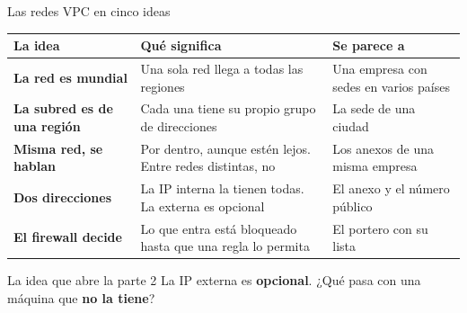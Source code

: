 \documentclass[aspectratio=169,10pt,c]{beamer}
\begin{document}
\begin{frame}{Las redes VPC en cinco ideas}
\renewcommand{\arraystretch}{1.4}
\centering\small
\begin{tabular}{@{}>{\raggedright\arraybackslash}p{3.7cm}>{\raggedright\arraybackslash}p{5.3cm}>{\raggedright\arraybackslash}p{3.9cm}@{}}
\toprule
\textbf{La idea} & \textbf{Qué significa} & \textbf{Se parece a}\\
\midrule
\textbf{La red es mundial} & Una sola red llega a todas las regiones & Una empresa con sedes en varios países\\
\textbf{La subred es de una región} & Cada una tiene su propio grupo de direcciones & La sede de una ciudad\\
\textbf{Misma red, se hablan} & Por dentro, aunque estén lejos. Entre redes distintas, no & Los anexos de una misma empresa\\
\textbf{Dos direcciones} & La IP interna la tienen todas. La externa es opcional & El anexo y el número público\\
\textbf{El firewall decide} & Lo que entra está bloqueado hasta que una regla lo permita & El portero con su lista\\
\bottomrule
\end{tabular}
\par\vspace{2mm}
\begin{alertblock}{La idea que abre la parte 2}
\small La IP externa es \textbf{opcional}. ¿Qué pasa con una máquina que \textbf{no la tiene}?
\end{alertblock}
\end{frame}
\end{document}
